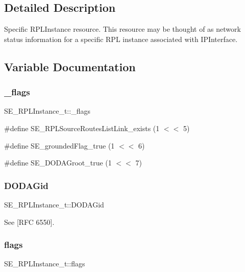 \subsection{Detailed Description}
Specific R\+P\+L\+Instance resource. This resource may be thought of as network status information for a specific R\+PL instance associated with I\+P\+Interface. 

\subsection{Variable Documentation}
\mbox{\label{group__RPLInstance_ga915b676adc88c489d4e4c8f66d306819}} 
\subsubsection{\texorpdfstring{\+\_\+flags}{\_flags}}
{\footnotesize\ttfamily S\+E\+\_\+\+R\+P\+L\+Instance\+\_\+t\+::\+\_\+flags}

\#define S\+E\+\_\+\+R\+P\+L\+Source\+Routes\+List\+Link\+\_\+exists (1 $<$$<$ 5)

\#define S\+E\+\_\+grounded\+Flag\+\_\+true (1 $<$$<$ 6)

\#define S\+E\+\_\+\+D\+O\+D\+A\+Groot\+\_\+true (1 $<$$<$ 7) \mbox{\label{group__RPLInstance_gada9d3472a6be71b1180ba77a6e919bdf}} 
\subsubsection{\texorpdfstring{D\+O\+D\+A\+Gid}{DODAGid}}
{\footnotesize\ttfamily S\+E\+\_\+\+R\+P\+L\+Instance\+\_\+t\+::\+D\+O\+D\+A\+Gid}

See \mbox{[}R\+FC 6550\mbox{]}. \mbox{\label{group__RPLInstance_ga0148c5566a77d44da206ea45559c1f63}} 
\subsubsection{\texorpdfstring{flags}{flags}}
{\footnotesize\ttfamily S\+E\+\_\+\+R\+P\+L\+Instance\+\_\+t\+::flags}

